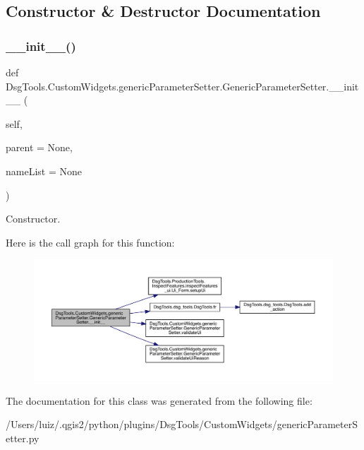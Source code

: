 \subsection{Constructor \& Destructor Documentation}
\mbox{\label{class_dsg_tools_1_1_custom_widgets_1_1generic_parameter_setter_1_1_generic_parameter_setter_aae00591e49484b2a5748dd39fac28bc5}} 
\subsubsection{\texorpdfstring{\+\_\+\+\_\+init\+\_\+\+\_\+()}{\_\_init\_\_()}}
{\footnotesize\ttfamily def Dsg\+Tools.\+Custom\+Widgets.\+generic\+Parameter\+Setter.\+Generic\+Parameter\+Setter.\+\_\+\+\_\+init\+\_\+\+\_\+ (\begin{DoxyParamCaption}\item[{}]{self,  }\item[{}]{parent = {\ttfamily None},  }\item[{}]{name\+List = {\ttfamily None} }\end{DoxyParamCaption})}

\begin{DoxyVerb}Constructor.\end{DoxyVerb}
 Here is the call graph for this function\+:
\nopagebreak
\begin{figure}[H]
\begin{center}
\leavevmode
\includegraphics[width=350pt]{class_dsg_tools_1_1_custom_widgets_1_1generic_parameter_setter_1_1_generic_parameter_setter_aae00591e49484b2a5748dd39fac28bc5_cgraph}
\end{center}
\end{figure}


The documentation for this class was generated from the following file\+:\begin{DoxyCompactItemize}
\item 
/\+Users/luiz/.\+qgis2/python/plugins/\+Dsg\+Tools/\+Custom\+Widgets/generic\+Parameter\+Setter.\+py\end{DoxyCompactItemize}

